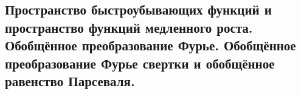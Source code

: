 \subsection{Пространство быстроубывающих функций и пространство функций медленного роста. Обобщённое преобразование Фурье. Обобщённое преобразование Фурье свертки и обобщённое равенство Парсеваля.}